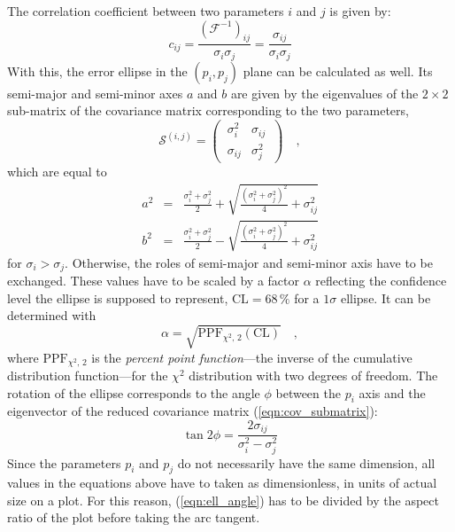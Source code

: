 The correlation coefficient between two parameters $i$ and $j$ is given by:
\begin{equation}
 c_{ij}
   = \frac{\left(\mathcal{F}^{-1}\right)_{ij}}{\sigma_i \sigma_j}
   = \frac{\sigma_{ij}}{\sigma_i \sigma_j}
 \label{eqn:corr_coeff}
\end{equation}
With this, the error ellipse in the $(p_i,p_j)$ plane can be calculated as
well. Its semi-major and semi-minor axes $a$ and $b$ are given by the
eigenvalues of the $2\times 2$ sub-matrix of the covariance matrix corresponding
to the two parameters,
\begin{equation}
 \mathcal{S}^{(i,j)} =
 \begin{pmatrix}
  \,\sigma_i^2 & \sigma_{ij}\, \\
  \,\sigma_{ij} & \sigma_j^2\,
 \end{pmatrix} \quad,
 \label{eqn:cov_submatrix}
\end{equation}
which are equal to \cite{Fisher_ellipse}
\begin{eqnarray}
 a^2 &=& \frac{\sigma_i^2 + \sigma_j^2}{2} +
         \sqrt{\frac{\left(\sigma_i^2+\sigma_j^2\right)^2}{4}+\sigma_{ij}^2} \\
 b^2 &=& \frac{\sigma_i^2 + \sigma_j^2}{2} -
         \sqrt{\frac{\left(\sigma_i^2+\sigma_j^2\right)^2}{4} + \sigma_{ij}^2} 
\end{eqnarray}
for $\sigma_i > \sigma_j$. Otherwise, the roles of semi-major and semi-minor
axis have to be exchanged. These values have to be scaled by a factor $\alpha$
reflecting the confidence level the ellipse is supposed to represent, \eg
$\mathrm{CL} = 68\,\%$ for a $1\sigma$ ellipse. It can be determined with
\begin{equation}
 \alpha = \sqrt{\mathrm{PPF}_{\chi^2,\,2}(\mathrm{CL})} \quad,
\end{equation}
where $\mathrm{PPF}_{\chi^2,\,2}$ is the \emph{percent point function}---the
inverse of the cumulative distribution function---for the $\chi^2$ distribution
with two degrees of freedom.
The rotation of the ellipse corresponds to the angle $\phi$ between the $p_i$
axis and the eigenvector of the reduced covariance matrix
(\ref{eqn:cov_submatrix}):
\begin{equation}
 \tan 2\phi = \frac{2\sigma_{ij}}{\sigma_i^2 - \sigma_j^2}
 \label{eqn:ell_angle}
\end{equation}
Since the parameters $p_i$ and $p_j$ do not necessarily have the same
dimension, all values in the equations above have to taken as dimensionless,
\ie in units of actual size on a plot. For this reason, (\ref{eqn:ell_angle})
has to be divided by the aspect ratio of the plot before taking the arc tangent.

